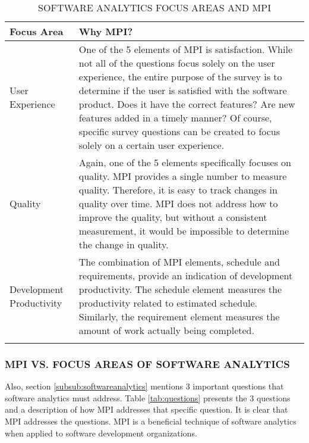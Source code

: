 \documentclass[SDSUThesis.tex]{subfiles}
\begin{document}
            \begin{longtable}{p{3cm}p{11cm}}
                \toprule%
                 \centering%
                 {\bfseries Focus Area}
                 & {\bfseries Why MPI?} \\
                
                \cmidrule[0.4pt](r{0.125em}){1-1}%
                \cmidrule[0.4pt](lr{0.125em}){2-2}%
                \endhead
                
                User Experience & One of the 5 elements of MPI is satisfaction.  While not all of the questions focus solely on the user experience, the entire purpose of the survey is to determine if the user is satisfied
                with the software product. Does it have the correct features? Are new features added in a timely manner? Of course, specific survey questions can be created to focus solely on a certain user experience. \\
                \myrowcolour%
                Quality & Again, one of the 5 elements specifically focuses on quality.  MPI provides a single number
                to measure quality.  Therefore, it is easy to track changes in quality over time.  MPI does not address
                how to improve the quality, but without a consistent measurement, it would be impossible to determine the change in quality. \\
                Development Productivity & The combination of MPI elements, schedule and requirements, provide an 
                indication of development productivity. The schedule element measures the productivity
                related to estimated schedule. Similarly, the requirement element measures the amount of
                work actually being completed.  \\
                
                \bottomrule
                
                \caption{SOFTWARE ANALYTICS FOCUS AREAS AND MPI}
                \label{tab:focusareas}
            \end{longtable}
        
        
        \subsubsection{MPI VS. FOCUS AREAS OF SOFTWARE ANALYTICS}
            Also, section \ref{subsub:softwareanalytics} mentions 3 important questions that
            software analytics must address.  Table \ref{tab:questions} presents the 3 questions
            and a description of how MPI addresses that specific question.  It is clear
            that MPI addresses the questions.  MPI is a beneficial technique of software
            analytics when applied to software development organizations.
        
\end{document}
